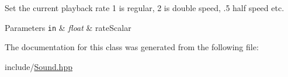 Set the current playback rate 1 is regular, 2 is double speed, .5 half speed etc. 
\begin{DoxyParams}[1]{Parameters}
\mbox{\tt in}  & {\em float} & rate\-Scalar \\
\hline
\end{DoxyParams}


The documentation for this class was generated from the following file\-:\begin{DoxyCompactItemize}
\item 
include/\hyperlink{Sound_8hpp}{Sound.\-hpp}\end{DoxyCompactItemize}
